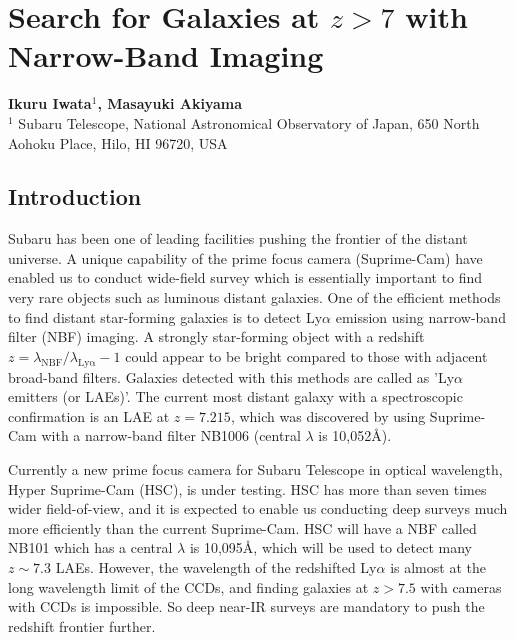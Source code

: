\def\thisdir{science/veryhighz/}


\section{Search for Galaxies at $z>7$ with Narrow-Band Imaging
\label{sec:nbf}}

\noindent
\begin{center}
{\bf Ikuru Iwata$^{1}$, Masayuki Akiyama}\\
$^1$ Subaru Telescope, National Astronomical Observatory of Japan, 650
North Aohoku Place, Hilo, HI 96720, USA
\end{center}
\vspace{0.5cm}

\subsection{Introduction}

Subaru has been one of leading facilities pushing the frontier of
the distant universe. A unique capability of the prime focus camera
(Suprime-Cam) have enabled us to conduct wide-field survey which is
essentially important to find very rare objects such as luminous distant
galaxies. One of the efficient methods to find distant star-forming
galaxies is to detect Ly$\alpha$ emission using narrow-band filter (NBF) 
imaging. A strongly star-forming object with a redshift 
$z = \lambda_\mathrm{NBF} / \lambda_\mathrm{Ly\alpha} -1$ could
appear to be bright compared to those with adjacent broad-band
filters. Galaxies detected with this methods are called as 'Ly$\alpha$
emitters (or LAEs)'. The current most distant galaxy with a spectroscopic 
confirmation is an LAE at $z=7.215$, which was discovered by
\citet{Shibuya2012} using Suprime-Cam with a narrow-band filter NB1006
(central $\lambda$ is 10,052\AA).

Currently a new prime focus camera for Subaru Telescope in optical
wavelength, Hyper Suprime-Cam (HSC), is under testing. HSC has more than
seven times wider field-of-view, and it is expected to enable us
conducting deep surveys much more efficiently than the current
Suprime-Cam. HSC will have a NBF called NB101 which has a central
$\lambda$ is 10,095\AA, which will be used to detect many $z\sim 7.3$
LAEs. 
However, the wavelength of the redshifted Ly$\alpha$ is almost at the
long wavelength limit of the CCDs, and finding galaxies at $z>7.5$ with
cameras with CCDs is impossible. So deep near-IR surveys are mandatory
to push the redshift frontier further.

